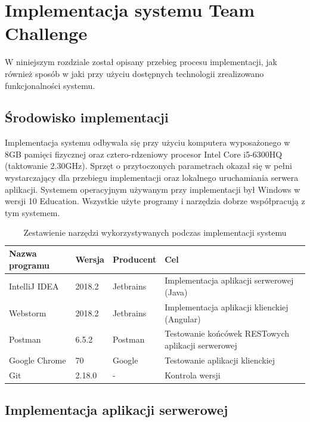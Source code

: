 \chapter{Implementacja systemu Team Challenge}

W niniejszym rozdziale został opisany przebieg procesu implementacji, jak również sposób w jaki przy użyciu dostępnych technologii zrealizowano funkcjonalności systemu. 

\section{Środowisko implementacji}

Implementacja systemu odbywała się przy użyciu komputera wyposażonego w 8GB pamięci fizycznej oraz cztero-rdzeniowy procesor Intel Core i5-6300HQ (taktowanie 2.30GHz). Sprzęt o przytoczonych parametrach okazał się w pełni wystarczający dla przebiegu implementacji oraz lokalnego uruchamiania serwera aplikacji. Systemem operacyjnym używanym przy implementacji był Windows w wersji 10 Education. Wszystkie użyte programy i narzędzia dobrze współpracują z tym systemem.

\begin{table}[H]
\centering\small
\caption{Zestawienie narzędzi wykorzystywanych podczas implementacji systemu}
\label{tab:szablon}
\begin{tabularx}{\linewidth}{|p{.2\linewidth}|p{.1\linewidth}|p{.1\linewidth}|X|}\hline
Nazwa programu & Wersja & Producent & Cel\\ \hline\hline

IntelliJ IDEA & 2018.2 & Jetbrains & Implementacja aplikacji serwerowej (Java) \\ \hline

Webstorm & 2018.2 & Jetbrains & Implementacja aplikacji klienckiej (Angular) \\ \hline

Postman & 6.5.2 & Postman & Testowanie końcówek RESTowych aplikacji serwerowej \\ \hline

Google Chrome & 70 & Google & Testowanie aplikacji klienckiej \\ \hline

Git & 2.18.0 & - & Kontrola wersji \\ \hline

\end{tabularx}
\end{table}

\section{Implementacja aplikacji serwerowej}

